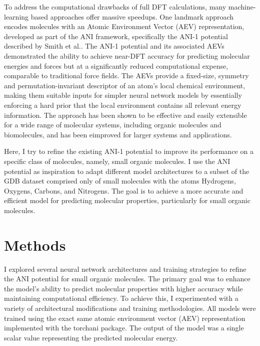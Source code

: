 To address the computational drawbacks of full DFT calculations, many machine-learning based approaches offer massive speedups. One landmark approach encodes molecules with an Atomic Environment Vector (AEV) representation, developed as part of the ANI framework, specifically the ANI-1 potential described by Smith et al.. \cite{smith2017ani} The ANI-1 potential and its associated AEVs demonstrated the ability to achieve near-DFT accuracy for predicting molecular energies and forces but at a significantly reduced computational expense, comparable to traditional force fields. The AEVs provide a fixed-size, symmetry and permutation-invariant descriptor of an atom's local chemical environment, making them suitable inputs for simpler neural network models by essentially enforcing a hard prior that the local environment contains all relevant energy information. The approach has been shown to be effective and easily extensible for a wide range of molecular systems, including organic molecules and biomolecules, and has been eimproved for larger systems and applications. \cite{devereux2020extending}

Here, I try to refine the existing ANI-1 potential to improve its performance on a specific class of molecules, namely, small organic molecules. I use the ANI potential as inspiration to adapt different model architectures to a subset of the GDB dataset \cite{ruddigkeit2012enumeration} comprised only of small molecules with the atoms Hydrogens, Oxygens, Carbons, and Nitrogens. The goal is to achieve a more accurate and efficient model for predicting molecular properties, particularly for small organic molecules.

\section{Methods}

I explored several neural network architectures and training strategies to refine the ANI potential for small organic molecules. The primary goal was to enhance the model's ability to predict molecular properties with higher accuracy while maintaining computational efficiency. To achieve this, I experimented with a variety of architectural modifications and training methodologies. All models were trained using the exact same atomic environment vector (AEV) representation implemented with the torchani package. \cite{gao2020torchani} The output of the model was a single scalar value representing the predicted molecular energy.

